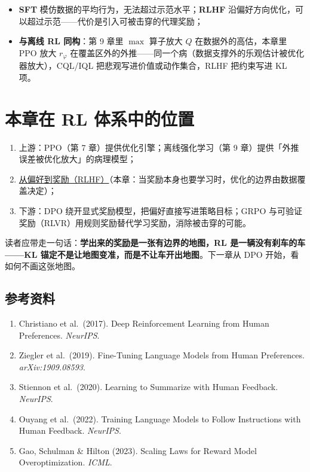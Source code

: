 \documentclass{article}
\begin{document}
\begin{itemize}
  \item \textbf{SFT} 模仿数据的平均行为，无法超过示范水平；\textbf{RLHF} 沿偏好方向优化，可以超过示范——代价是引入可被击穿的代理奖励；
  \item \textbf{与离线 RL 同构}：第 9 章里 $\max$ 算子放大 $Q$ 在数据外的高估，本章里 PPO 放大 $r_{\varphi}$ 在覆盖区外的外推——同一个病（数据支撑外的乐观估计被优化器放大），CQL/IQL 把悲观写进价值或动作集合，RLHF 把约束写进 KL 项。
\end{itemize}

\section*{本章在 RL 体系中的位置}

\begin{enumerate}
  \item 上游：PPO（第 7 章）提供优化引擎；离线强化学习（第 9 章）提供「外推误差被优化放大」的病理模型；
  \item \underline{从偏好到奖励（RLHF）}（本章：当奖励本身也要学习时，优化的边界由数据覆盖决定）；
  \item 下游：DPO 绕开显式奖励模型，把偏好直接写进策略目标；GRPO 与可验证奖励（RLVR）用规则奖励替代学习奖励，消除被击穿的可能。
\end{enumerate}

读者应带走一句话：\textbf{学出来的奖励是一张有边界的地图，RL 是一辆没有刹车的车——KL 锚定不是让地图变准，而是不让车开出地图}。下一章从 DPO 开始，看如何不画这张地图。

\subsection*{参考资料}

\begin{enumerate}
  \item Christiano et al.\ (2017). Deep Reinforcement Learning from Human Preferences. \textit{NeurIPS}.
  \item Ziegler et al.\ (2019). Fine-Tuning Language Models from Human Preferences. \textit{arXiv:1909.08593}.
  \item Stiennon et al.\ (2020). Learning to Summarize with Human Feedback. \textit{NeurIPS}.
  \item Ouyang et al.\ (2022). Training Language Models to Follow Instructions with Human Feedback. \textit{NeurIPS}.
  \item Gao, Schulman \& Hilton (2023). Scaling Laws for Reward Model Overoptimization. \textit{ICML}.
\end{enumerate}
\end{document}
